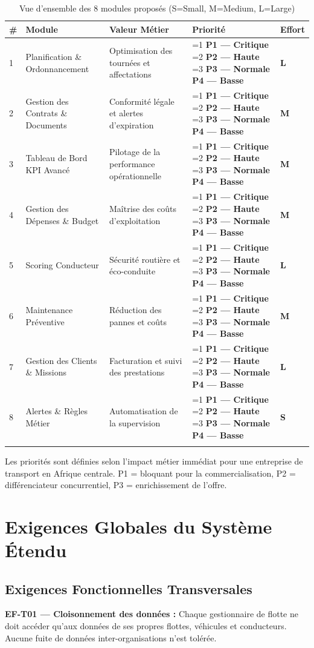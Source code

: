 \documentclass[12pt,a4paper]{report}
\newcommand{\prio}[1]{%
  \ifnum#1=1 \textcolor{fleeterror}{\textbf{P1 — Critique}}%
  \else\ifnum#1=2 \textcolor{fleetwarning}{\textbf{P2 — Haute}}%
  \else\ifnum#1=3 \textcolor{fleetsuccess}{\textbf{P3 — Normale}}%
  \else \textcolor{fleetgray}{\textbf{P4 — Basse}}%
  \fi\fi\fi}
\newcommand{\effort}[1]{\textcolor{fleetpurple}{\textbf{#1}}}
\begin{document}
\begin{longtable}{p{0.5cm}p{4cm}p{5.5cm}p{2cm}p{1.5cm}}
\toprule
\textbf{\#} & \textbf{Module} & \textbf{Valeur Métier} & \textbf{Priorité} & \textbf{Effort} \\
\midrule
\endhead
1 & Planification \& Ordonnancement & Optimisation des tournées et affectations & \prio{1} & \effort{L} \\
2 & Gestion des Contrats \& Documents & Conformité légale et alertes d'expiration & \prio{1} & \effort{M} \\
3 & Tableau de Bord KPI Avancé & Pilotage de la performance opérationnelle & \prio{1} & \effort{M} \\
4 & Gestion des Dépenses \& Budget & Maîtrise des coûts d'exploitation & \prio{2} & \effort{M} \\
5 & Scoring Conducteur & Sécurité routière et éco-conduite & \prio{2} & \effort{L} \\
6 & Maintenance Préventive & Réduction des pannes et coûts & \prio{2} & \effort{M} \\
7 & Gestion des Clients \& Missions & Facturation et suivi des prestations & \prio{3} & \effort{L} \\
8 & Alertes \& Règles Métier & Automatisation de la supervision & \prio{3} & \effort{S} \\
\bottomrule
\caption{Vue d'ensemble des 8 modules proposés (S=Small, M=Medium, L=Large)}
\end{longtable}

\begin{notebox}
Les priorités sont définies selon l'impact métier immédiat pour une entreprise de transport en Afrique centrale. P1 = bloquant pour la commercialisation, P2 = différenciateur concurrentiel, P3 = enrichissement de l'offre.
\end{notebox}

\chapter{Exigences Globales du Système Étendu}

\section{Exigences Fonctionnelles Transversales}

\begin{reqbox}
\textbf{EF-T01 — Cloisonnement des données :} Chaque gestionnaire de flotte ne doit accéder qu'aux données de ses propres flottes, véhicules et conducteurs. Aucune fuite de données inter-organisations n'est tolérée.
\end{reqbox}
\end{document}
